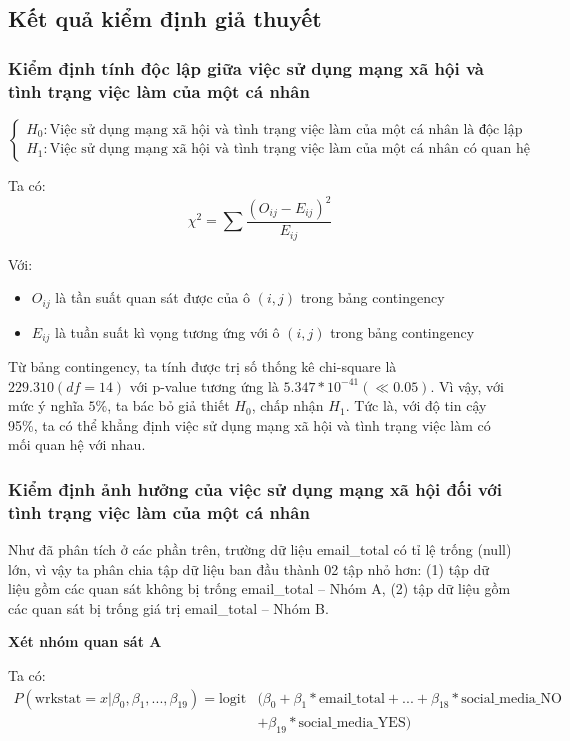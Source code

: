 \subsection{Kết quả kiểm định giả thuyết}
\subsubsection{Kiểm định tính độc lập giữa việc sử dụng mạng xã hội và tình trạng việc làm của một cá nhân}
$$
\left\{\begin{array}{l}
H_{0}: \text{Việc sử dụng mạng xã hội và tình trạng việc làm của một cá nhân là độc lập với nhau}\\
H_{1}: \text{Việc sử dụng mạng xã hội và tình trạng việc làm của một cá nhân có quan hệ với nhau}
\end{array}\right.
$$

Ta có:
$$
\chi^{2}=\sum \frac{\left(O_{i j}-E_{i j}\right)^{2}}{E_{i j}}
$$

Với:
\begin{itemize}
    \item $O_{i j}$ là tần suất quan sát được của ô $(i, j)$ trong bảng contingency
    \item $E_{i j}$ là tuần suất kì vọng tương ứng với ô $(i, j)$ trong bảng contingency
\end{itemize}

Từ bảng contingency, ta tính được trị số thống kê chi-square là $229.310(df=14)$ với p-value tương ứng là $5.347 * 10^{-41}(\ll 0.05)$. Vì vậy, với mức ý nghĩa $5 \%$, ta bác bỏ giả thiết $H_{0}$, chấp nhận $H_{1}$. Tức là, với độ tin cậy 95\%, ta có thể khẳng định việc sử dụng mạng xã hội và tình trạng việc làm có mối quan hệ với nhau.

\subsubsection{Kiểm định ảnh hưởng của việc sử dụng mạng xã hội đối với tình trạng việc làm của một cá nhân}
Như đã phân tích ở các phần trên, trường dữ liệu email\_total có tỉ lệ trống (null) lớn, vì vậy ta phân chia tập dữ liệu ban đầu thành 02 tập nhỏ hơn: (1) tập dữ liệu gồm các quan sát không bị trống email\_total – Nhóm A, (2) tập dữ liệu gồm các quan sát bị trống giá trị email\_total – Nhóm B.

\textbf{Xét nhóm quan sát A}

Ta có:
\begin{equation*}
\begin{aligned}
P(\mathrm{wrkstat} = x \vert \beta_0, \beta_1,..., \beta_{19}) = \mathrm{logit}&(\beta_0 + \beta_1 * \text{email\_total} + ... + \beta_{18} * \text{social\_media\_NO} \\
   & + \beta_{19} * \text{social\_media\_YES})
\end{aligned}
\end{equation*}

